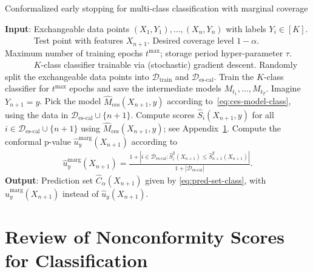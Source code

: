 \begin{algorithm}[H]
    \caption{Conformalized early stopping for multi-class classification with marginal coverage}
    \label{alg:class_full_seq_marg}
    \begin{algorithmic}[1]
        \STATE \textbf{Input}: Exchangeable data points $(X_{1},Y_{1}), \ldots, (X_{n},Y_{n})$ with labels $Y_i \in [K]$.
        \STATE \textcolor{white}{\textbf{Input}:} Test point with features $X_{n+1}$. Desired coverage level $1-\alpha$.
        \STATE \textcolor{white}{\textbf{Input}:} Maximum number of training epochs $t^{\text{max}}$; storage period hyper-parameter $\tau$.
        \STATE \textcolor{white}{\textbf{Input}:} $K$-class classifier trainable via (stochastic) gradient descent.
        \STATE Randomly split the exchangeable data points into $\mathcal{D}_{\text{train}}$ and $\mathcal{D}_{\text{es-cal}}$.
        \STATE Train the $K$-class classifier for $t^{\text{max}}$ epochs and save the intermediate models $M_{t_1} , \dots, M_{t_T}$.
        \STATE Imagine $Y_{n+1}=y$.
        \STATE Pick the model $\hat{M}_{\text{ces}}(X_{n+1},y)$ according to~\eqref{eq:ces-model-class}, using the data in $\mathcal{D}_{\text{es-cal}} \cup \{n+1\}$.
        \STATE Compute scores $\hat{S}_i(X_{n+1},y)$ for all $i \in \mathcal{D}_{\text{es-cal}} \cup \{n+1\}$ using $\hat{M}_{\text{ces}}(X_{n+1},y)$; see Appendix~\ref{app:class-scores}.
        \STATE Compute the conformal p-value $\hat{u}^{\text{marg}}_y(X_{n+1})$ according to
        \begin{align}\label{eq:conformal_pval-class_marg}
          \hat{u}^{\text{marg}}_y(X_{n+1}) = \frac{1 + |i \in \mathcal{D}_{\text{es-cal}}: \hat{S}_{i}^y(X_{n+1}) \leq \hat{S}_{n+1}^y(X_{n+1})|}{1+|\mathcal{D}_{\text{es-cal}}|}.
        \end{align}
        \ENDFOR
        \STATE \textbf{Output}: Prediction set $\hat{C}_{\alpha}(X_{n+1})$ given by \eqref{eq:pred-set-class}, with $\hat{u}^{\text{marg}}_y(X_{n+1})$ instead of $\hat{u}_y(X_{n+1})$.
    \end{algorithmic}
\end{algorithm}


\section{Review of Nonconformity Scores for Classification} \label{app:class-scores}

